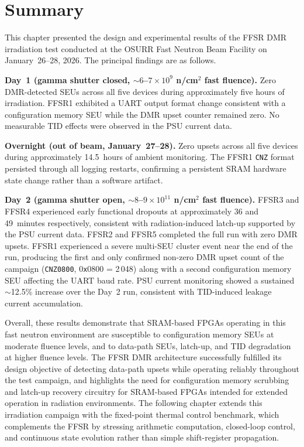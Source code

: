 \section{Summary}
\label{sec:ch6_summary}

This chapter presented the design and experimental results of the FFSR
DMR irradiation test conducted at the OSURR Fast Neutron Beam Facility
on January~26--28, 2026.  The principal findings are as follows.

\textbf{Day~1 (gamma shutter closed, $\sim$$6$--$7 \times 10^9$
n/cm$^2$ fast fluence).}  Zero DMR-detected SEUs across all five devices
during approximately five hours of irradiation.  FFSR1 exhibited a UART
output format change consistent with a configuration memory SEU while
the DMR upset counter remained zero.  No measurable TID effects were
observed in the PSU current data.

\textbf{Overnight (out of beam, January~27--28).}  Zero upsets across
all five devices during approximately 14.5~hours of ambient monitoring.
The FFSR1 \texttt{CNZ} format persisted through all logging restarts,
confirming a persistent SRAM hardware state change rather than a
software artifact.

\textbf{Day~2 (gamma shutter open, $\sim$$8$--$9 \times 10^{11}$
n/cm$^2$ fast fluence).}  FFSR3 and FFSR4 experienced early functional
dropouts at approximately 36 and 49~minutes respectively, consistent
with radiation-induced latch-up supported by the PSU current data.
FFSR2 and FFSR5 completed the full run with zero DMR upsets.  FFSR1
experienced a severe multi-SEU cluster event near the end of the run,
producing the first and only confirmed non-zero DMR upset count of the
campaign (\texttt{CNZ0800}, 0\texttt{x}0800 = 2\,048) along with a
second configuration memory SEU affecting the UART baud rate.  PSU
current monitoring showed a sustained $\sim$12.5\% increase over the
Day~2 run, consistent with TID-induced leakage current accumulation.

Overall, these results demonstrate that SRAM-based FPGAs operating in
this fast neutron environment are susceptible to configuration memory
SEUs at moderate fluence levels, and to data-path SEUs, latch-up, and
TID degradation at higher fluence levels.  The FFSR DMR architecture
successfully fulfilled its design objective of detecting data-path upsets
while operating reliably throughout the test campaign, and highlights the
need for configuration memory scrubbing and latch-up recovery circuitry
for SRAM-based FPGAs intended for extended operation in radiation
environments.  The following chapter extends this irradiation campaign
with the fixed-point thermal control benchmark, which complements the
FFSR by stressing arithmetic computation, closed-loop control, and
continuous state evolution rather than simple shift-register propagation.